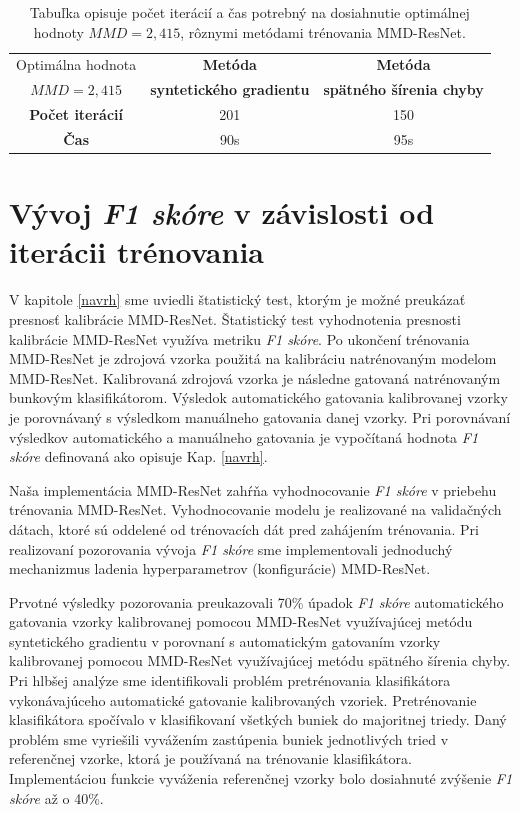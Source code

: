 \begin{table}[h!]
\caption[Dosiahnutie optimálnej hodnoty MMD rôznymi metódami trénovania MMD-ResNet]{Tabuľka opisuje počet iterácií a čas potrebný na dosiahnutie optimálnej hodnoty $MMD=2,415$, rôznymi metódami trénovania MMD-ResNet.}
\label{vysledok6b}
\begin{center}
\begin{tabular}{|c|c|c|}
\hline
 Optimálna hodnota & \textbf{Metóda} & \textbf{Metóda} \\
 $MMD=2,415$ & \textbf{syntetického gradientu} & \textbf{spätného šírenia chyby} \\
\hline
\textbf{Počet iterácií} & 201 & 150 \\
\hline
\textbf{Čas} & 90s & 95s \\
\hline
\end{tabular}%
\end{center}
\end{table}

\section{Vývoj \textit{F1 skóre} v závislosti od iterácii trénovania}
\label{vyvoj_F1_skore_kapitola}

V kapitole \ref{navrh} sme uviedli štatistický test, ktorým je možné preukázať presnosť kalibrácie MMD-ResNet. Štatistický test vyhodnotenia presnosti kalibrácie MMD-ResNet využíva metriku \textit{F1 skóre}. Po ukončení trénovania MMD-ResNet je zdrojová vzorka použitá na kalibráciu natrénovaným modelom MMD-ResNet. Kalibrovaná zdrojová vzorka je následne gatovaná natrénovaným bunkovým klasifikátorom. Výsledok automatického gatovania kalibrovanej vzorky je porovnávaný s výsledkom manuálneho gatovania danej vzorky. Pri porovnávaní výsledkov automatického a manuálneho gatovania je vypočítaná hodnota \textit{F1 skóre} definovaná ako opisuje Kap. \ref{navrh}.

Naša implementácia MMD-ResNet zahŕňa vyhodnocovanie \textit{F1 skóre} v priebehu trénovania MMD-ResNet. Vyhodnocovanie modelu je realizované na validačných dátach, ktoré sú oddelené od trénovacích dát pred zahájením trénovania. Pri realizovaní pozorovania vývoja \textit{F1 skóre} sme implementovali jednoduchý mechanizmus ladenia hyperparametrov (konfigurácie) MMD-ResNet.

Prvotné výsledky pozorovania preukazovali 70\% úpadok \textit{F1 skóre} automatického gatovania vzorky kalibrovanej pomocou MMD-ResNet využívajúcej metódu syntetického gradientu v porovnaní s automatickým gatovaním vzorky kalibrovanej pomocou MMD-ResNet využívajúcej metódu spätného šírenia chyby. Pri hlbšej analýze sme identifikovali problém pretrénovania klasifikátora vykonávajúceho automatické gatovanie kalibrovaných vzoriek. Pretrénovanie klasifikátora spočívalo v klasifikovaní všetkých buniek do majoritnej triedy. Daný problém sme vyriešili vyvážením zastúpenia buniek jednotlivých tried v referenčnej vzorke, ktorá je používaná na trénovanie klasifikátora. Implementáciou funkcie vyváženia referenčnej vzorky bolo dosiahnuté zvýšenie \textit{F1 skóre} až o 40\%.

